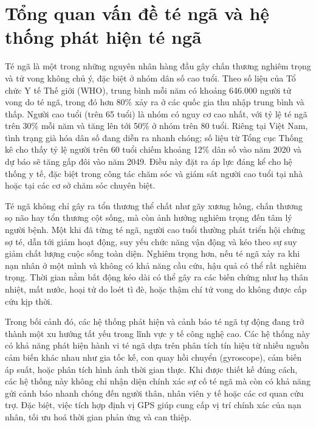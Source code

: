 \section{Tổng quan vấn đề té ngã và hệ thống phát hiện té ngã}

Té ngã là một trong những nguyên nhân hàng đầu gây chấn thương nghiêm trọng và tử vong không chủ ý, đặc biệt ở nhóm dân số cao tuổi. Theo số liệu của Tổ chức Y tế Thế giới (WHO), trung bình mỗi năm có khoảng 646.000 người tử vong do té ngã, trong đó hơn 80\% xảy ra ở các quốc gia thu nhập trung bình và thấp. Người cao tuổi (trên 65 tuổi) là nhóm có nguy cơ cao nhất, với tỷ lệ té ngã trên 30\% mỗi năm và tăng lên tới 50\% ở nhóm trên 80 tuổi. Riêng tại Việt Nam, tình trạng già hóa dân số đang diễn ra nhanh chóng; số liệu từ Tổng cục Thống kê cho thấy tỷ lệ người trên 60 tuổi chiếm khoảng 12\% dân số vào năm 2020 và dự báo sẽ tăng gấp đôi vào năm 2049. Điều này đặt ra áp lực đáng kể cho hệ thống y tế, đặc biệt trong công tác chăm sóc và giám sát người cao tuổi tại nhà hoặc tại các cơ sở chăm sóc chuyên biệt.

Té ngã không chỉ gây ra tổn thương thể chất như gãy xương hông, chấn thương sọ não hay tổn thương cột sống, mà còn ảnh hưởng nghiêm trọng đến tâm lý người bệnh. Một khi đã từng té ngã, người cao tuổi thường phát triển hội chứng sợ té, dẫn tới giảm hoạt động, suy yếu chức năng vận động và kéo theo sự suy giảm chất lượng cuộc sống toàn diện. Nghiêm trọng hơn, nếu té ngã xảy ra khi nạn nhân ở một mình và không có khả năng cầu cứu, hậu quả có thể rất nghiêm trọng. Thời gian nằm bất động kéo dài có thể gây ra các biến chứng như hạ thân nhiệt, mất nước, hoại tử do loét tì đè, hoặc thậm chí tử vong do không được cấp cứu kịp thời.

Trong bối cảnh đó, các hệ thống phát hiện và cảnh báo té ngã tự động đang trở thành một xu hướng tất yếu trong lĩnh vực y tế công nghệ cao. Các hệ thống này có khả năng phát hiện hành vi té ngã dựa trên phân tích tín hiệu từ nhiều nguồn cảm biến khác nhau như gia tốc kế, con quay hồi chuyển (gyroscope), cảm biến áp suất, hoặc phân tích hình ảnh thời gian thực. Khi được thiết kế đúng cách, các hệ thống này không chỉ nhận diện chính xác sự cố té ngã mà còn có khả năng gửi cảnh báo nhanh chóng đến người thân, nhân viên y tế hoặc các cơ quan cứu trợ. Đặc biệt, việc tích hợp định vị GPS giúp cung cấp vị trí chính xác của nạn nhân, tối ưu hoá thời gian phản ứng và can thiệp.
